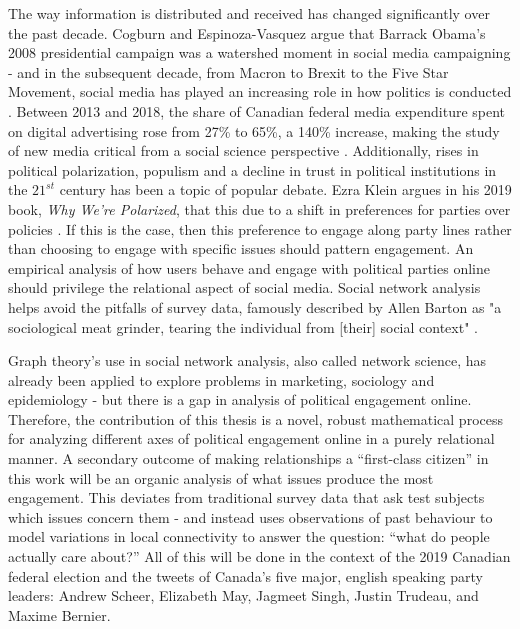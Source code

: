 The way information is distributed and received has changed significantly over the past decade. 
Cogburn and Espinoza-Vasquez argue that Barrack Obama’s 2008 presidential campaign was a watershed moment in social media campaigning - and in the subsequent decade, from Macron to Brexit to the Five Star Movement, social media has played an increasing role in how politics is conducted \cite{cogburn2011networked}. 
Between 2013 and 2018, the share of Canadian federal media expenditure spent on digital advertising rose from 27\% to 65\%, a 140\% increase, making the study of new media critical from a social science perspective \cite{annualReportCanadaAdvertisingActivities_2018}. 
Additionally, rises in political polarization, populism and a decline in trust in political institutions in the $21^{st}$ century has been a topic of popular debate. 
Ezra Klein argues in his 2019 book, \emph{Why We're Polarized}, that this due to a shift in preferences for parties over policies \cite{levitsky2018democracies}. 
If this is the case, then this preference to engage along party lines rather than choosing to engage with specific issues should pattern engagement. 
An empirical analysis of how users behave and engage with political parties online should privilege the relational aspect of social media. 
Social network analysis helps avoid the pitfalls of survey data, famously described by Allen Barton as "a sociological meat grinder, tearing the individual from [their] social context" \cite{freeman2004development}.

Graph theory’s use in social network analysis, also called network science, has already been applied to explore problems in marketing, sociology and epidemiology - but there is a gap in analysis of political engagement online. 
Therefore, the contribution of this thesis is a novel, robust mathematical process for analyzing different axes of political engagement online in a purely relational manner. 
A secondary outcome of making relationships a “first-class citizen” in this work will be an organic analysis of what issues produce the most engagement. 
This deviates from traditional survey data that ask test subjects which issues concern them - and instead uses observations of past behaviour to model variations in local connectivity to answer the question: “what do people actually care about?” 
All of this will be done in the context of the 2019 Canadian federal election and the tweets of Canada's five major, english speaking party leaders: Andrew Scheer, Elizabeth May, Jagmeet Singh, Justin Trudeau, and Maxime Bernier. 

